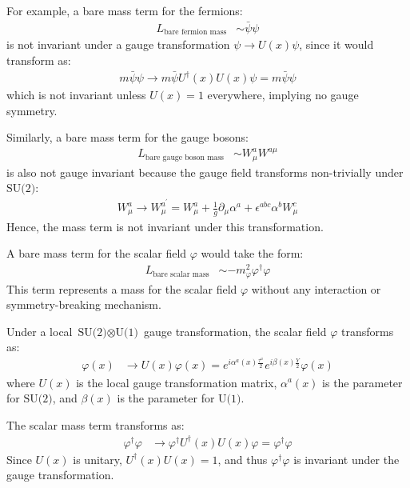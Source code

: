For example, a bare mass term for the fermions:
\begin{align*}
    L_{\text{bare fermion mass}} &\sim \bar{\psi} \psi
\end{align*}
is not invariant under a gauge transformation $\psi \to U(x) \psi$, since it would transform as:
\begin{align*}
    m \bar{\psi} \psi \to m \bar{\psi} U^\dagger(x) U(x) \psi = m \bar{\psi} \psi
\end{align*}
which is not invariant unless $U(x) = 1$ everywhere, implying no gauge symmetry.

Similarly, a bare mass term for the gauge bosons:
\begin{align*}
    L_{\text{bare gauge boson mass}} &\sim W_\mu^a W^{a\mu}
\end{align*}
is also not gauge invariant because the gauge field transforms non-trivially under $\text{SU(2)}$:
\begin{align*}
    W_\mu^a \to W_\mu^{a^\prime } = W_\mu^a + \frac{1}{g} \partial_\mu \alpha^a + \epsilon^{abc} \alpha^b W_\mu^c
\end{align*}
Hence, the mass term is not invariant under this transformation.

A bare mass term for the scalar field $\varphi$ would take the form:
\begin{align}
    L_{\text{bare scalar mass}} &\sim - m_\varphi^2 \varphi^\dagger \varphi
\end{align}
This term represents a mass for the scalar field $\varphi$ without any interaction or symmetry-breaking mechanism.

Under a local $\text{SU(2)} \otimes \text{U(1)}$ gauge transformation, the scalar field $\varphi$ transforms as:
\begin{align*}
    \varphi(x) &\to U(x) \varphi(x) = e^{\displaystyle i \alpha^a(x) \frac{\tau^a}{2}} e^{\displaystyle i \beta(x) \frac{Y}{2}} \varphi(x)
\end{align*}
where $U(x)$ is the local gauge transformation matrix, $\alpha^a(x)$ is the parameter for $\text{SU(2)}$, and $\beta(x)$ is the parameter for $\text{U(1)}$.

The scalar mass term transforms as:
\begin{align*}
    \varphi^\dagger \varphi &\to \varphi^\dagger U^\dagger(x) U(x) \varphi = \varphi^\dagger \varphi
\end{align*}
Since $U(x)$ is unitary, $U^\dagger(x) U(x) = 1$, and thus $\varphi^\dagger \varphi$ is invariant under the gauge transformation.

